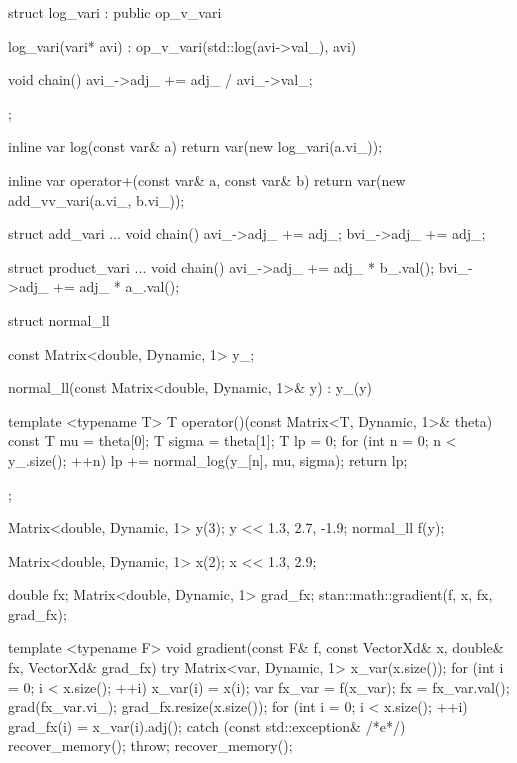 \documentclass[10pt]{report}
\begin{document}
%
\begin{stancode}
struct log_vari : public op_v_vari {
  log_vari(vari* avi) :
    op_v_vari(std::log(avi->val_), avi) { }

  void chain() {
    avi_->adj_ += adj_ / avi_->val_;
  }
};

inline var log(const var& a) {
  return var(new log_vari(a.vi_));
}
\end{stancode}


%
\begin{stancode}
inline var operator+(const var& a, const var& b) {
  return var(new add_vv_vari(a.vi_, b.vi_));
}

struct add_vari  ...
  void chain() {
    avi_->adj_ += adj_;
    bvi_->adj_ += adj_;
  }

struct product_vari ...
  void chain() {
    avi_->adj_ += adj_ * b_.val();
    bvi_->adj_ += adj_ * a_.val();
  }
\end{stancode}


%
\begin{stancode}
struct normal_ll {
  const Matrix<double, Dynamic, 1> y_;

  normal_ll(const Matrix<double, Dynamic, 1>& y) : y_(y) { }

  template <typename T>
  T operator()(const Matrix<T, Dynamic, 1>& theta) const {
    T mu = theta[0];
    T sigma = theta[1];
    T lp = 0;
    for (int n = 0; n < y_.size(); ++n)
      lp += normal_log(y_[n], mu, sigma);
    return lp;
  }
};
\end{stancode}


%
\begin{stancode}
Matrix<double, Dynamic, 1> y(3);
y << 1.3, 2.7, -1.9;
normal_ll f(y);

Matrix<double, Dynamic, 1> x(2);
x << 1.3, 2.9;

double fx;
Matrix<double, Dynamic, 1> grad_fx;
stan::math::gradient(f, x, fx, grad_fx);
\end{stancode}


%
\vspace*{-6pt}
\begin{stancode}
template <typename F>
void gradient(const F& f,  const VectorXd& x,
              double& fx,  VectorXd& grad_fx) {
  try {
    Matrix<var, Dynamic, 1> x_var(x.size());
    for (int i = 0; i < x.size(); ++i) x_var(i) = x(i);
    var fx_var = f(x_var);
    fx = fx_var.val();
    grad(fx_var.vi_);
    grad_fx.resize(x.size());
    for (int i = 0; i < x.size(); ++i)
      grad_fx(i) = x_var(i).adj();
  } catch (const std::exception& /*e*/) {
    recover_memory();   throw;
  }
  recover_memory();
}
\end{stancode}
\end{document}
